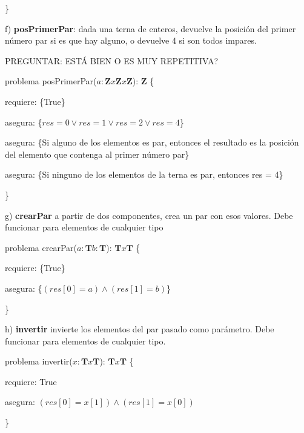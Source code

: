 \documentclass{article}
\begin{document}
\}\newline

f) \textbf{posPrimerPar}: dada una terna de enteros, devuelve la posición del primer número par si es que hay alguno, o devuelve 4 si son todos impares.\newline

PREGUNTAR: ESTÁ BIEN O ES MUY REPETITIVA?

problema posPrimerPar($a: \mathbf{Z}x\mathbf{Z}x\mathbf{Z}$): $\mathbf{Z}$ \{


    requiere: \{True\}


    asegura: \{$res= 0 \vee res =1 \vee res = 2 \vee res =4$\}
    
    
    asegura: \{Si alguno de los elementos es par, entonces el resultado es la posición del elemento que contenga al primer número par\}
    
    
    asegura: \{Si ninguno de los elementos de la terna es par, entonces res = 4\}

\} \newline

g) \textbf{crearPar} a partir de dos componentes, crea un par con esos valores. Debe funcionar para elementos de cualquier tipo \newline

problema crearPar($a: \mathbf{T} b:\mathbf{T}$): $\mathbf{T} x \mathbf{T}$ \{

    requiere: \{True\}


    asegura: \{$(res[0]=a) \wedge (res[1]=b)$\}

\} \newline


h) \textbf{invertir} invierte los elementos del par pasado como parámetro. Debe funcionar para elementos de cualquier tipo. \newline

problema invertir($x: \mathbf{T}x\mathbf{T}$): $\mathbf{T}x\mathbf{T}$ \{


    \qquad requiere: {True}

    \qquad asegura: {$(res[0] = x[1]) \wedge (res[1] = x[0]) $}

\}\newline
\end{document}
